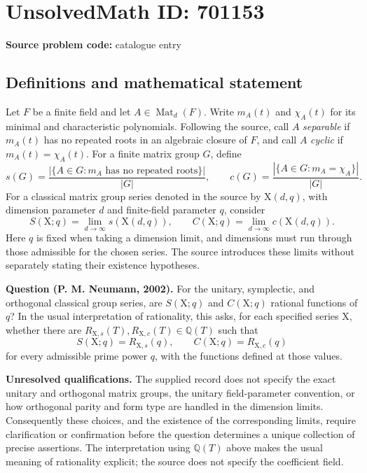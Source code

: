 \documentclass[11pt]{article}
\newcommand{\Q}{\mathbb{Q}}
\begin{document}
\section*{UnsolvedMath ID: 701153}
\textbf{Source problem code:} catalogue entry
\subsection{Definitions and mathematical statement}
Let \(F\) be a finite field and let \(A\in\operatorname{Mat}_d(F)\). Write \(m_A(t)\) and \(\chi_A(t)\) for its minimal and characteristic polynomials. Following the source, call \(A\) \emph{separable} if \(m_A(t)\) has no repeated roots in an algebraic closure of \(F\), and call \(A\) \emph{cyclic} if \(m_A(t)=\chi_A(t)\). For a finite matrix group \(G\), define
\[
s(G)=\frac{|\{A\in G:m_A\text{ has no repeated roots}\}|}{|G|},\qquad
c(G)=\frac{|\{A\in G:m_A=\chi_A\}|}{|G|}.
\]
For a classical matrix group series denoted in the source by \(\mathrm{X}(d,q)\), with dimension parameter \(d\) and finite-field parameter \(q\), consider
\[
S(\mathrm{X};q)=\lim_{d\to\infty}s(\mathrm{X}(d,q)),\qquad
C(\mathrm{X};q)=\lim_{d\to\infty}c(\mathrm{X}(d,q)).
\]
Here \(q\) is fixed when taking a dimension limit, and dimensions must run through those admissible for the chosen series. The source introduces these limits without separately stating their existence hypotheses.

\textbf{Question (P. M. Neumann, 2002).} For the unitary, symplectic, and orthogonal classical group series, are \(S(\mathrm{X};q)\) and \(C(\mathrm{X};q)\) rational functions of \(q\)? In the usual interpretation of rationality, this asks, for each specified series \(\mathrm{X}\), whether there are \(R_{\mathrm{X},s}(T),R_{\mathrm{X},c}(T)\in\Q(T)\) such that
\[
S(\mathrm{X};q)=R_{\mathrm{X},s}(q),\qquad
C(\mathrm{X};q)=R_{\mathrm{X},c}(q)
\]
for every admissible prime power \(q\), with the functions defined at those values.

\textbf{Unresolved qualifications.} The supplied record does not specify the exact unitary and orthogonal matrix groups, the unitary field-parameter convention, or how orthogonal parity and form type are handled in the dimension limits. Consequently these choices, and the existence of the corresponding limits, require clarification or confirmation before the question determines a unique collection of precise assertions. The interpretation using \(\Q(T)\) above makes the usual meaning of rationality explicit; the source does not specify the coefficient field.
\end{document}
